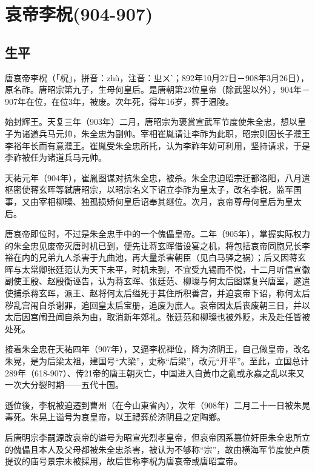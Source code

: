 
\section{哀帝李柷\tiny(904-907)}

\subsection{生平}

唐哀帝李柷（「柷」，拼音：zhù，注音：ㄓㄨˋ；892年10月27日－908年3月26日），原名祚。唐昭宗第九子，生母何皇后。是唐朝第23位皇帝（除武曌以外），904年－907年在位，在位3年，被废。次年死，得年16岁，葬于温陵。

始封辉王。天复三年（903年）二月，唐昭宗为褒赏宣武军节度使朱全忠，想以皇子为诸道兵马元帅，朱全忠为副帅。宰相崔胤请让李祚为此职，昭宗则因长子濮王李𥙿年长而有意濮王。崔胤受朱全忠所托，认为李祚年幼可利用，坚持请求，于是李祚被任为诸道兵马元帅。

天祐元年（904年），崔胤图谋对抗朱全忠，被杀。朱全忠迫昭宗迁都洛阳，八月遣枢密使蒋玄晖等弑唐昭宗，以昭宗名义下诏立李祚为皇太子，改名李柷，监军国事，又由宰相柳璨、独孤损矫何皇后诏奉其继位。次月，哀帝尊母何皇后为皇太后。

唐哀帝即位时，不过是朱全忠手中的一个傀儡皇帝。二年（905年），掌握实际权力的朱全忠见废帝灭唐时机已到，便先让蒋玄晖借设宴之机，将包括哀帝同胞兄长李裕在内的兄弟九人杀害于九曲池，再大量杀害朝臣（见白马驿之祸）；后又因蒋玄晖与太常卿张廷范认为天下未平，时机未到，不宜受九锡而不悦，十二月听信宣徽副使王殷、赵殷衡诬告，认为蒋玄晖、张廷范、柳璨与何太后图谋复兴唐室，遂遣使捕杀蒋玄晖，派王、赵将何太后缢死于其住所积善宫，并迫哀帝下诏，称何太后秽乱宫闱自杀谢罪，追回皇太后宝册，追废为庶人。哀帝因太后丧废朝三日，并以太后因宫闱丑闻自杀为由，取消新年郊礼。张廷范和柳璨也被外贬，未及赴任皆被处死。

接着朱全忠在天祐四年（907年），又逼李柷禅位，降为济阴王，自己做皇帝，改名朱晃，是为后梁太祖，建国号“大梁”，史称“后梁”，改元“开平”。至此，立国总计289年（618-907）、传21帝的唐王朝灭亡，中国进入自黃巾之亂或永嘉之乱以来又一次大分裂时期——五代十国。

遜位後，李柷被迫遷到曹州（在今山東省內），次年（908年）二月二十一日被朱晃毒死。朱晃上谥号为哀皇帝，以王禮葬於济阴县之定陶鄉。

后唐明宗李嗣源改哀帝的谥号为昭宣光烈孝皇帝，但哀帝因系篡位奸臣朱全忠所立的傀儡且本人及父母都被朱全忠杀害，被认为不够称“宗”，故由横海军节度使卢质提议的庙号景宗未被採用，故后世称李柷为唐哀帝或唐昭宣帝。

